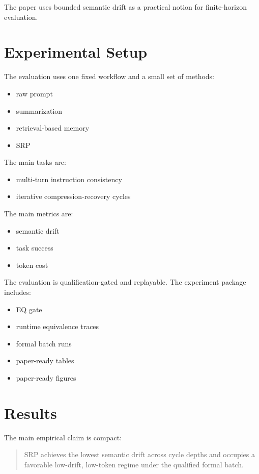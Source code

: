 \documentclass[11pt]{article}
\begin{document}
The paper uses bounded semantic drift as a practical notion for finite-horizon evaluation.

\section{Experimental Setup}
The evaluation uses one fixed workflow and a small set of methods:
\begin{itemize}[leftmargin=*]
  \item raw prompt
  \item summarization
  \item retrieval-based memory
  \item SRP
\end{itemize}

The main tasks are:
\begin{itemize}[leftmargin=*]
  \item multi-turn instruction consistency
  \item iterative compression-recovery cycles
\end{itemize}

The main metrics are:
\begin{itemize}[leftmargin=*]
  \item semantic drift
  \item task success
  \item token cost
\end{itemize}

The evaluation is qualification-gated and replayable. The experiment package includes:
\begin{itemize}[leftmargin=*]
  \item EQ gate
  \item runtime equivalence traces
  \item formal batch runs
  \item paper-ready tables
  \item paper-ready figures
\end{itemize}

\section{Results}
The main empirical claim is compact:

\begin{quote}
SRP achieves the lowest semantic drift across cycle depths and occupies a favorable low-drift, low-token regime under the qualified formal batch.
\end{quote}
\end{document}
